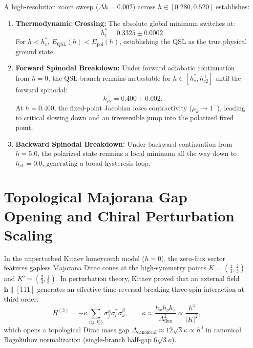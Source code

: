 \begin{proposition}
\label{thm:m1_6_critical_transition}
A high-resolution zoom sweep ($\Delta h = 0.002$) across $h \in [0.280, 0.520]$ establishes:
\begin{enumerate}
\item \textbf{Thermodynamic Crossing:} The absolute global minimum switches at:
\begin{equation}
\label{eq:m1_6_hc_star}
h_c^* = 0.3325 \pm 0.0002.
\end{equation}
For $h < h_c^*$, $E_{\mathrm{QSL}}(h) < E_{\mathrm{pol}}(h)$, establishing the QSL as the true physical ground state.
\item \textbf{Forward Spinodal Breakdown:} Under forward adiabatic continuation from $h=0$, the QSL branch remains metastable for $h \in [h_c^*, h_{c2}^+]$ until the forward spinodal:
\begin{equation}
\label{eq:m1_6_hc2_plus}
h_{c2}^+ = 0.400 \pm 0.002.
\end{equation}
At $h = 0.400$, the fixed-point Jacobian loses contractivity ($\mu_k \to 1^-$), leading to critical slowing down and an irreversible jump into the polarized fixed point.
\item \textbf{Backward Spinodal Breakdown:} Under backward continuation from $h=5.0$, the polarized state remains a local minimum all the way down to $h_{c1}^- = 0.0$, generating a broad hysteresis loop.
\end{enumerate}
\end{proposition}



\section{Topological Majorana Gap Opening and Chiral Perturbation Scaling}
\label{sec:m1_6_majorana_gap_scaling}

In the unperturbed Kitaev honeycomb model ($h = 0$), the zero-flux sector features gapless Majorana Dirac cones at the high-symmetry points $K = (\frac{1}{3}, \frac{2}{3})$ and $K' = (\frac{2}{3}, \frac{1}{3})$. In perturbation theory, Kitaev proved that an external field $\mathbf{h} \parallel [111]$ generates an effective time-reversal-breaking three-spin interaction at third order:
\begin{equation}
\label{eq:m1_6_kitaev_kappa}
H^{(3)} = -\kappa \sum_{\langle\langle j, k\rangle\rangle} \sigma_j^\alpha \sigma_l^\gamma \sigma_k^\beta, \qquad \kappa \approx \frac{h_x h_y h_z}{\Delta_{\mathrm{flux}}^2} \propto \frac{h^3}{|K|^2},
\end{equation}
which opens a topological Dirac mass gap $\Delta_{\mathrm{canonical}} \approx 12\sqrt{3}\kappa \propto h^3$ in canonical Bogoliubov normalization (single-branch half-gap $6\sqrt{3}\kappa$).

